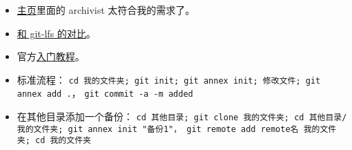 
\begin{itemize}
\item \href{https://git-annex.branchable.com/}{主页}里面的 archivist 太符合我的需求了。
\item \href{https://stackoverflow.com/questions/39337586/how-do-git-lfs-and-git-annex-differ}{和 git-lfs 的对比}。
\item 官方\href{https://git-annex.branchable.com/walkthrough/}{入门教程}。
\item 标准流程： \verb|cd 我的文件夹; git init; git annex init; 修改文件; git annex add .|， \verb|git commit -a -m added|
\item 在其他目录添加一个备份： \verb|cd 其他目录; git clone 我的文件夹; cd 其他目录/我的文件夹; git annex init "备份1"， git remote add remote名 我的文件夹; cd 我的文件夹|
\end{itemize}
